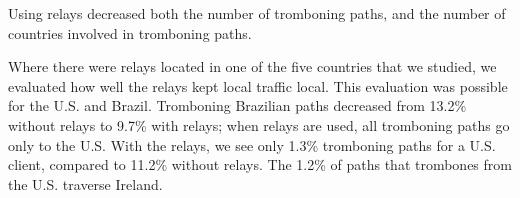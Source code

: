 \begin{finding}
Using relays decreased both the number of tromboning paths, and the
number of countries involved in tromboning paths.
\end{finding}
\noindent
Where there were relays located in one of the five
countries that we studied, we evaluated how well the relays kept local
traffic local.  This evaluation was possible for the U.S. and Brazil.
Tromboning Brazilian paths decreased from 13.2\% without relays to
9.7\% with relays; when relays are used, all tromboning paths go only
to the U.S.  With the relays, we see only 1.3\% tromboning paths for a
U.S. client, compared to 11.2\% without relays.  The 1.2\% of
paths that trombones from the U.S. traverse Ireland.
